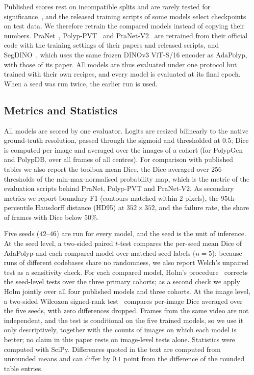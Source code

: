 \documentclass{ieeeaccess}
\begin{document}
Published scores rest on incompatible splits and are rarely tested for significance~\cite{urooj2026metrics}, and the released training scripts of some models select checkpoints on test data. We therefore retrain the compared models instead of copying their numbers. PraNet~\cite{fan2020pranet}, Polyp-PVT~\cite{dong2021polyp} and PraNet-V2~\cite{hu2026pranetv2} are retrained from their official code with the training settings of their papers and released scripts, and SegDINO~\cite{yang2025segdino}, which uses the same frozen DINOv3 ViT-S/16 encoder as AdaPolyp, with those of its paper. All models are thus evaluated under one protocol but trained with their own recipes, and every model is evaluated at its final epoch. When a seed was run twice, the earlier run is used.

\subsection{Metrics and Statistics}
\label{sec:stats}
All models are scored by one evaluator. Logits are resized bilinearly to the native ground-truth resolution, passed through the sigmoid and thresholded at $0.5$; Dice is computed per image and averaged over the images of a cohort (for PolypGen and PolypDB, over all frames of all centres). For comparison with published tables we also report the toolbox mean Dice, the Dice averaged over $256$ thresholds of the min-max-normalised probability map, which is the metric of the evaluation scripts behind PraNet, Polyp-PVT and PraNet-V2. As secondary metrics we report boundary F1 (contours matched within $2$ pixels), the $95$th-percentile Hausdorff distance (HD95) at $352\times352$, and the failure rate, the share of frames with Dice below $50\%$.

Five seeds ($42$--$46$) are run for every model, and the seed is the unit of inference. At the seed level, a two-sided paired $t$-test compares the per-seed mean Dice of AdaPolyp and each compared model over matched seed labels ($n=5$); because runs of different codebases share no randomness, we also report Welch's unpaired test as a sensitivity check. For each compared model, Holm's procedure~\cite{holm1979simple} corrects the seed-level tests over the three primary cohorts; as a second check we apply Holm jointly over all four published models and three cohorts. At the image level, a two-sided Wilcoxon signed-rank test~\cite{wilcoxon1945individual} compares per-image Dice averaged over the five seeds, with zero differences dropped. Frames from the same video are not independent, and the test is conditional on the five trained models, so we use it only descriptively, together with the counts of images on which each model is better; no claim in this paper rests on image-level tests alone. Statistics were computed with SciPy. Differences quoted in the text are computed from unrounded means and can differ by $0.1$ point from the difference of the rounded table entries.
\end{document}

